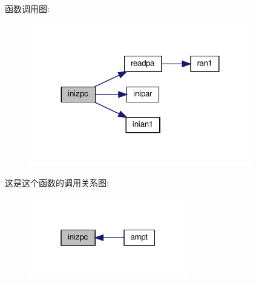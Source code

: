 函数调用图\+:
\nopagebreak
\begin{figure}[H]
\begin{center}
\leavevmode
\includegraphics[width=275pt]{inizpc_8f90_a50e341ef3b4ebd37f09f3dd74d39f2c8_cgraph}
\end{center}
\end{figure}
这是这个函数的调用关系图\+:
\nopagebreak
\begin{figure}[H]
\begin{center}
\leavevmode
\includegraphics[width=196pt]{inizpc_8f90_a50e341ef3b4ebd37f09f3dd74d39f2c8_icgraph}
\end{center}
\end{figure}
